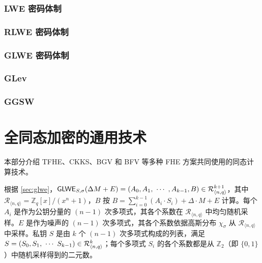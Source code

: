 \documentclass[11pt]{article}
\begin{document}
\clearpage

\section{LWE 密码体制}
\label{sec:lwe}


\clearpage

\section{RLWE 密码体制}
\label{sec:rlwe}


\clearpage

\section{GLWE 密码体制}
\label{sec:glwe}


\clearpage

\section{GLev}
\label{sec:glev}


\clearpage

\section{GGSW}
\label{sec:ggsw}


\clearpage


\part{全同态加密的通用技术}
\label{part:generic-fhe}

\renewcommand{\thesection}{C-\arabic{section}}
\setcounter{section}{0}

本部分介绍 TFHE、CKKS、BGV 和 BFV 等多种 FHE 方案共同使用的同态计算技术。

根据 \autoref{sec:glwe}，$\textsf{GLWE}_{S,\sigma}(\Delta M + E) = (A_0, A_1, \text{ } \text{$\cdots$} \text{ } , A_{k-1}, B) \in \mathcal{R}_{\langle n, q \rangle }^{k + 1}$，其中 $\mathcal{R}_{\langle n,q \rangle} = \mathbb{Z}_q[x] / (x^n + 1)$，$B$ 按 $B = \sum\limits_{i=0}^{k-1}{(A_i \cdot S_i)} + \Delta \cdot M + E$ 计算。每个 $A_i$ 是作为公钥分量的 $(n-1)$ 次多项式，其各个系数在 $\mathcal{R}_{\langle n, q \rangle }$ 中均匀随机采样。$E$ 是作为噪声的 $(n-1)$ 次多项式，其各个系数依据高斯分布 $\chi_\sigma$ 从 $\mathcal{R}_{\langle n, q \rangle }$ 中采样。私钥 $S$ 是由 $k$ 个 $(n-1)$ 次多项式构成的列表，满足 $S = (S_0, S_1, \text{ } \text{$\cdots$} \text{ } S_{k-1} ) \in \mathcal{R}_{\langle n, q \rangle }^k$；每个多项式 $S_i$ 的各个系数都是从 $\mathbb{Z}_2$（即 $\{0, 1\}$）中随机采样得到的二元数。
\end{document}
